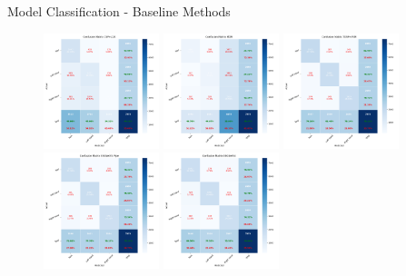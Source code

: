 \begin{frame}{Model Classification - Baseline Methods}
    \begin{figure}[htpb!]
        \centering
        \includegraphics[width=0.30\textwidth]{figures/classification/confusion_matrix_csp_lda}
        \includegraphics[width=0.30\textwidth]{figures/classification/confusion_matrix_mdm}
        \includegraphics[width=0.30\textwidth]{figures/classification/confusion_matrix_tgsp_svm}
        \includegraphics[width=0.30\textwidth]{figures/classification/confusion_matrix_eegnetv4_pipe}
        \includegraphics[width=0.30\textwidth]{figures/classification/confusion_matrix_eegnetv4}
    \end{figure}
\end{frame}

